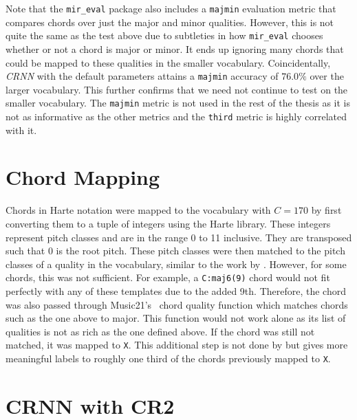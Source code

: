 Note that the \texttt{mir\_eval} package also includes a \texttt{majmin} evaluation metric that compares chords over just the major and minor qualities. However, this is not quite the same as the test above due to subtleties in how \texttt{mir\_eval} chooses whether or not a chord is major or minor. It ends up ignoring many chords that could be mapped to these qualities in the smaller vocabulary. Coincidentally, \emph{CRNN} with the default parameters attains a \texttt{majmin} accuracy of $76.0\%$ over the larger vocabulary. This further confirms that we need not continue to test on the smaller vocabulary. The  \texttt{majmin} metric is not used in the rest of the thesis as it is not as informative as the other metrics and the \texttt{third} metric is highly correlated with it.

\section{Chord Mapping}\label{app:chord_mapping}

Chords in Harte notation were mapped to the vocabulary with $C=170$ by first converting them to a tuple of integers using the Harte library. These integers represent pitch classes and are in the range 0 to 11 inclusive. They are transposed such that 0 is the root pitch. These pitch classes were then matched to the pitch classes of a quality in the vocabulary, similar to the work by \citet{StructuredTraining}. However, for some chords, this was not sufficient. For example, a \texttt{C:maj6(9)} chord would not fit perfectly with any of these templates due to the added 9th. Therefore, the chord was also passed through Music21's~\citep{music21} chord quality function which matches chords such as the one above to major. This function would not work alone as its list of qualities is not as rich as the one defined above. If the chord was still not matched, it was mapped to \texttt{X}. This additional step is not done by \citet{StructuredTraining} but gives more meaningful labels to roughly one third of the chords previously mapped to \texttt{X}.

\section{CRNN with CR2}\label{app:crnn_with_cr2}

